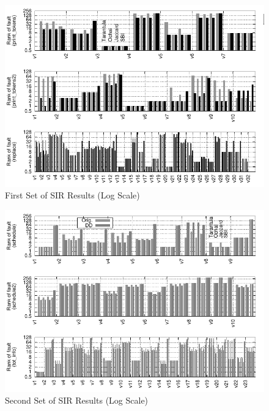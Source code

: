 
\begin{figure}
  \centering
  \includegraphics[width=1.8\columnwidth]{siemens1}
  \caption{First Set of SIR Results (Log Scale)}
  \label{fig:allSIR1}
\end{figure}

\begin{figure}
  \centering
  \includegraphics[width=1.8\columnwidth]{siemens2}
  \caption{Second Set of SIR Results (Log Scale)}
  \label{fig:allSIR2}
\end{figure}


